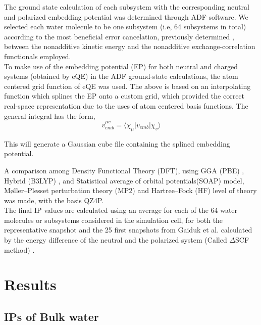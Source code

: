 \documentclass[12pt,a4paper]{article}
\begin{document}
The ground state calculation of each subsystem with the corresponding neutral and polarized embedding potential was determined through ADF
\cite{te2001chemistry} software. We selected each water molecule to be one subsystem (i.e, 64 subsystems in total) according to the most beneficial
error cancelation, previously determined
\cite{genova2016avoiding, kevorkyants2013calculating, pavanello2011modelling, ramos2016critical, solovyeva2012spin},
between the nonadditive kinetic energy and the nonadditive exchange-correlation functionals employed. \\

To make use of the embedding potential (EP) for both neutral and charged systems (obtained by eQE) in the ADF ground-state
calculations, the atom centered grid function of eQE was used. The above is based on an interpolating function which 
splines the EP onto a custom grid, which provided the correct real-space representation due to the uses of atom centered
basis functions. The general integral has the form, \\

\begin{equation}
	v_{emb}^{\mu v} = \langle \chi_{\mu}|v_{emb}|\chi_{v}\rangle 
\end{equation}

This will generate a Gaussian cube file containing the splined embedding potential\cite{genova2017eqe}.

A comparison among Density Functional Theory (DFT), using GGA (PBE) \cite{perdew1996phys}, Hybrid (B3LYP) \cite{hertwig1997parameterization}, 
and Statistical average of orbital potentials(SOAP) model\cite{schipper2000molecular, gritsenko1999approximation}, 
Møller–Plesset perturbation theory (MP2) \cite{head1988mp2} and Hartree–Fock (HF) \cite{marshall1961unrestricted} level of theory was made, with the basis QZ4P. \\ 

The final IP values are calculated using an average for each of the 64 water molecules or subsystems considered in the simulation cell, 
for both the representative snapshot and the 25 first snapshots from Gaiduk et al. calculated by the energy difference of the neutral
and the polarized system (Called $\Delta$SCF method) \cite{bagus1965self,waskom2017mwaskom}.

\section{Results}
\subsection{IPs of Bulk water}
\end{document}
